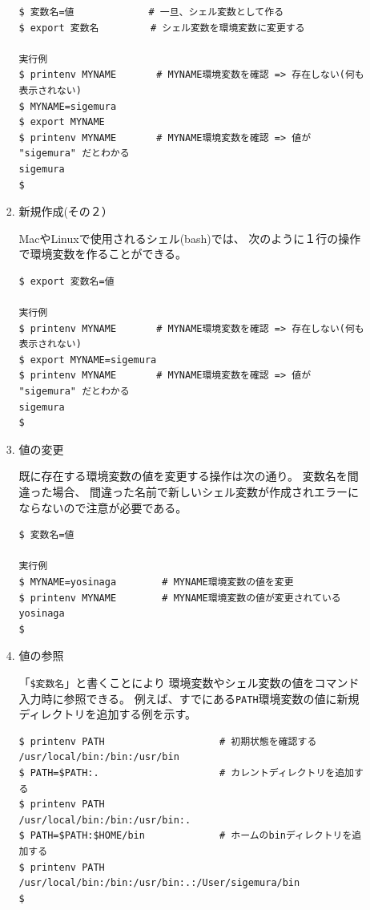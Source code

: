 \documentclass[a4j,dvipdfmx]{jarticle}
\begin{document}
\begin{enumerate}
\begin{enumerate}
\begin{enumerate}
\begin{lstlisting}[numbers=none]
$ 変数名=値             # 一旦、シェル変数として作る
$ export 変数名         # シェル変数を環境変数に変更する

実行例
$ printenv MYNAME       # MYNAME環境変数を確認 => 存在しない(何も表示されない)
$ MYNAME=sigemura
$ export MYNAME
$ printenv MYNAME       # MYNAME環境変数を確認 => 値が "sigemura" だとわかる
sigemura
$
\end{lstlisting}

\item 新規作成(その２）

MacやLinuxで使用されるシェル(bash)では、
次のように１行の操作で環境変数を作ることができる。

\begin{lstlisting}[numbers=none]
$ export 変数名=値

実行例
$ printenv MYNAME       # MYNAME環境変数を確認 => 存在しない(何も表示されない)
$ export MYNAME=sigemura
$ printenv MYNAME       # MYNAME環境変数を確認 => 値が "sigemura" だとわかる
sigemura
$
\end{lstlisting}

\item 値の変更

既に存在する環境変数の値を変更する操作は次の通り。
変数名を間違った場合、
間違った名前で新しいシェル変数が作成されエラーにならないので注意が必要である。

\begin{lstlisting}[numbers=none]
$ 変数名=値

実行例
$ MYNAME=yosinaga        # MYNAME環境変数の値を変更
$ printenv MYNAME        # MYNAME環境変数の値が変更されている
yosinaga
$
\end{lstlisting}

\item 値の参照

「\verb/$変数名/」と書くことにより
環境変数やシェル変数の値をコマンド入力時に参照できる。
例えば、すでにある\verb/PATH/環境変数の値に新規ディレクトリを追加する例を示す。
\begin{lstlisting}[numbers=none]
$ printenv PATH                    # 初期状態を確認する
/usr/local/bin:/bin:/usr/bin
$ PATH=$PATH:.                     # カレントディレクトリを追加する
$ printenv PATH
/usr/local/bin:/bin:/usr/bin:.
$ PATH=$PATH:$HOME/bin             # ホームのbinディレクトリを追加する
$ printenv PATH
/usr/local/bin:/bin:/usr/bin:.:/User/sigemura/bin
$
\end{lstlisting}


\end{enumerate}
\end{enumerate}
\end{enumerate}
\end{document}
